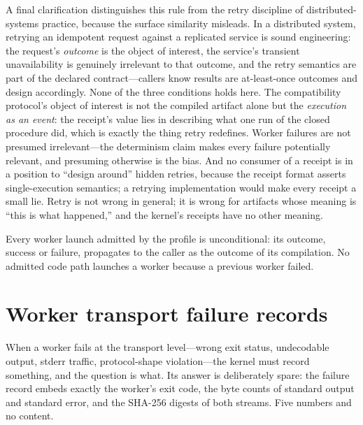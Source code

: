 A final clarification distinguishes this rule from the retry discipline of distributed-systems practice, because the surface similarity misleads. In a distributed system, retrying an idempotent request against a replicated service is sound engineering: the request's \emph{outcome} is the object of interest, the service's transient unavailability is genuinely irrelevant to that outcome, and the retry semantics are part of the declared contract---callers know results are at-least-once outcomes and design accordingly. None of the three conditions holds here. The compatibility protocol's object of interest is not the compiled artifact alone but the \emph{execution as an event}: the receipt's value lies in describing what one run of the closed procedure did, which is exactly the thing retry redefines. Worker failures are not presumed irrelevant---the determinism claim makes every failure potentially relevant, and presuming otherwise is the bias. And no consumer of a receipt is in a position to ``design around'' hidden retries, because the receipt format asserts single-execution semantics; a retrying implementation would make every receipt a small lie. Retry is not wrong in general; it is wrong for artifacts whose meaning is ``this is what happened,'' and the kernel's receipts have no other meaning.

\begin{invariant}\label{ch08:inv:no-retry}
Every worker launch admitted by the profile is unconditional: its outcome, success or failure, propagates to the caller as the outcome of its compilation. No admitted code path launches a worker because a previous worker failed.
\end{invariant}

\section{Worker transport failure records}\label{ch08:transport}

When a worker fails at the transport level---wrong exit status, undecodable output, stderr traffic, protocol-shape violation---the kernel must record something, and the question is what. Its answer is deliberately spare: the failure record embeds exactly the worker's exit code, the byte counts of standard output and standard error, and the SHA-256 digests of both streams. Five numbers and no content.

